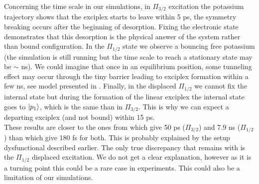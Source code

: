 Concerning the time scale in our simulations, in $\Pi_{3/2}$ excitation the potassium trajectory shows that the exciplex starts to leave within 5 ps, the symmetry breaking occurs after the beginning of desorption. 
Fixing the electronic state demonstrates that this desorption is the physical answer of the system rather than bound configuration. 
In the $\Pi_{1/2}$ state we observe a bouncing free potassium (the simulation is still running but the time scale to reach a stationary state may be $\sim$ ns).
We could imagine that once in an equilibrium position, some tunneling effect may occur through the tiny barrier leading to exciplex formation within a few ns, see model presented in \cite{Reh2000A,Reh2000B}.
Finally, in the displaced $\Pi_{1/2}$ we cannot fix the internal state but during the formation of the linear exciplex the internal state goes to $\ket{p_1}$, which is the same than in $\Pi_{3/2}$.
This is why we can expect a departing exciplex (and not bound) within 15 ps.\\

These results are closer to the ones from \cite{Reh2000A,Reh2000B} which give 50 ps ($\Pi_{3/2}$) and 7.9 ns ($\Pi_{1/2}$) than \cite{Sch2001} which give 180 fs for both. 
This is probably explained by the setup dysfunctional described earlier.
The only true discrepancy that remains with \cite{Reh2000A,Reh2000B} is the $\Pi_{1/2}$ displaced excitation. We do not get a clear explanation, however as it is a turning point this could be a rare case in experiments. 
This could also be a limitation of our simulations.
